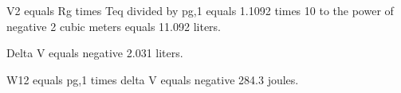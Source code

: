 V2 equals Rg times Teq divided by pg,1 equals 1.1092 times 10 to the power of negative 2 cubic meters equals 11.092 liters.  

Delta V equals negative 2.031 liters.  

W12 equals pg,1 times delta V equals negative 284.3 joules.